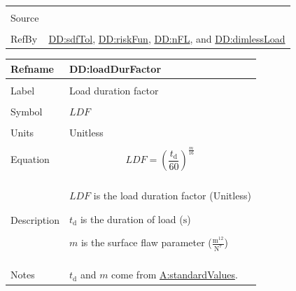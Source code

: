 \documentclass[12pt]{article}
\begin{document}
\begin{minipage}{\textwidth}
\begin{tabular}{>{\raggedright}p{}>{\raggedright\arraybackslash}p{}}
\\ \midrule \\
Source & \cite{astm2009}
         
\\ \midrule \\
RefBy & \hyperref[DD:sdfTol]{DD:sdfTol}, \hyperref[DD:riskFun]{DD:riskFun}, \hyperref[DD:nFL]{DD:nFL}, and \hyperref[DD:dimlessLoad]{DD:dimlessLoad}
        
\\ \bottomrule
\end{tabular}
\end{minipage}

\vspace{\baselineskip}
\noindent
\begin{minipage}{\textwidth}
\begin{tabular}{>{\raggedright}p{}>{\raggedright\arraybackslash}p{}}
\toprule \textbf{Refname} & \textbf{DD:loadDurFactor}
\label{DD:loadDurFactor}
\\ \midrule \\
Label & Load duration factor
        
\\ \midrule \\
Symbol & $\mathit{LDF}$
         
\\ \midrule \\
Units & Unitless
        
\\ \midrule \\
Equation & \begin{displaymath}
           \mathit{LDF}=\left(\frac{{t_{\text{d}}}}{60}\right)^{\frac{m}{16}}
           \end{displaymath}
\\ \midrule \\
Description & \begin{symbDescription}
              \item{$\mathit{LDF}$ is the load duration factor (Unitless)}
              \item{${t_{\text{d}}}$ is the duration of load (${\text{s}}$)}
              \item{$m$ is the surface flaw parameter ($\frac{\text{m}^{12}}{\text{N}^{7}}$)}
              \end{symbDescription}
\\ \midrule \\
Notes & ${t_{\text{d}}}$ and $m$ come from \hyperref[assumpSV]{A:standardValues}.
        

\end{tabular}
\end{minipage}
\end{document}

